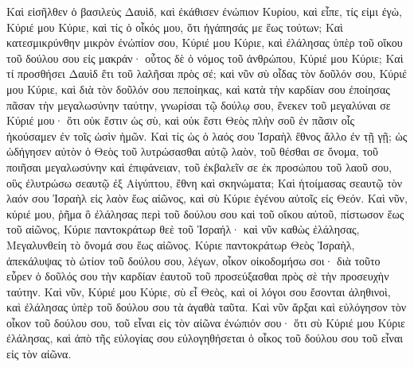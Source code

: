 {\par }{\PP {}Καὶ εἰσῆλθεν ὁ βασιλεὺς Δαυὶδ, καὶ ἐκάθισεν ἐνώπιον Κυρίου, καὶ εἶπε, τίς εἰμι ἐγὼ, Κύριέ μου Κύριε, καὶ τίς ὁ οἶκός μου, ὅτι ἠγάπησάς με ἕως τούτων;
Καὶ κατεσμικρύνθην μικρὸν ἐνώπίον σου, Κύριέ μου Κύριε, καὶ ἐλάλησας ὑπὲρ τοῦ οἴκου τοῦ δούλου σου εἰς μακράν· οὗτος δὲ ὁ νόμος τοῦ ἀνθρώπου, Κύριέ μου Κύριε;
Καὶ τί προσθήσει Δαυὶδ ἔτι τοῦ λαλῆσαι πρὸς σέ; καὶ νῦν σὺ οἶδας τὸν δοῦλόν σου, Κύριέ μου Κύριε,
καὶ διὰ τὸν δοῦλόν σου πεποίηκας, καὶ κατὰ τὴν καρδίαν σου ἐποίησας πᾶσαν τὴν μεγαλωσύνην ταύτην, γνωρίσαι τῷ δούλῳ σου, ἕνεκεν τοῦ μεγαλύναι σε
Κύριέ μου· ὅτι οὐκ ἔστιν ὡς σὺ, καὶ οὐκ ἔστι Θεὸς πλὴν σοῦ ἐν πᾶσιν οἷς ἠκούσαμεν ἐν τοῖς ὠσὶν ἡμῶν.
Καὶ τίς ὡς ὁ λαός σου Ἰσραὴλ ἔθνος ἄλλο ἐν τῇ γῇ; ὡς ὡδήγησεν αὐτὸν ὁ Θεὸς τοῦ λυτρώσασθαι αὐτῷ λαὸν, τοῦ θέσθαι σε ὄνομα, τοῦ ποιῆσαι μεγαλωσύνην καὶ ἐπιφάνειαν, τοῦ ἐκβαλεῖν σε ἐκ προσώπου τοῦ λαοῦ σου, οὓς ἐλυτρώσω σεαυτῷ ἐξ Αἰγύπτου, ἔθνη καὶ σκηνώματα;
Καὶ ἡτοίμασας σεαυτῷ τὸν λαόν σου Ἰσραὴλ εἰς λαὸν ἕως αἰῶνος, καὶ σὺ Κύριε ἐγένου αὐτοῖς εἰς Θεόν.
Καὶ νῦν, κύριέ μου, ῥῆμα ὃ ἐλάλησας περὶ τοῦ δούλου σου καὶ τοῦ οἴκου αὐτοῦ, πίστωσον ἕως τοῦ αἰῶνος, Κύριε παντοκράτωρ θεὲ τοῦ Ἰσραήλ· καὶ νῦν καθὼς ἐλάλησας,
Μεγαλυνθείη τὸ ὄνομά σου ἕως αἰῶνος.
Κύριε παντοκράτωρ Θεὸς Ἰσραὴλ, ἀπεκάλυψας τὸ ὠτίον τοῦ δούλου σου, λέγων, οἶκον οἰκοδομήσω σοι· διὰ τοῦτο εὗρεν ὁ δοῦλός σου τὴν καρδίαν ἑαυτοῦ τοῦ προσεύξασθαι πρὸς σὲ τὴν προσευχὴν ταύτην.
Καὶ νῦν, Κύριέ μου Κύριε, σὺ εἶ Θεὸς, καὶ οἱ λόγοι σου ἔσονται ἀληθινοὶ, καὶ ἐλάλησας ὑπὲρ τοῦ δούλου σου τὰ ἀγαθὰ ταῦτα.
Καὶ νῦν ἄρξαι καὶ εὐλόγησον τὸν οἶκον τοῦ δούλου σου, τοῦ εἶναι εἰς τὸν αἰῶνα ἐνώπιόν σου· ὅτι σὺ Κύριέ μου Κύριε ἐλάλησας, καὶ ἀπὸ τῆς εὐλογίας σου εὐλογηθήσεται ὁ οἶκος τοῦ δούλου σου τοῦ εἶναι εἰς τὸν αἰῶνα.

}
